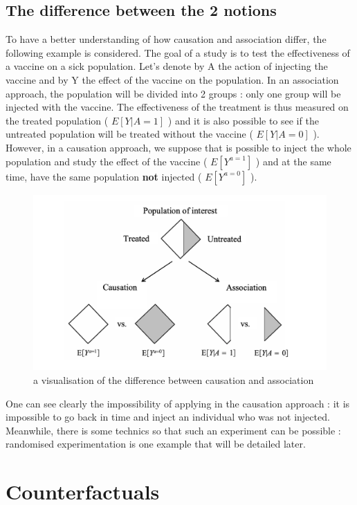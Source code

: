\documentclass{article}
\begin{document}
	\subsection{The difference between the 2 notions}

To have a better understanding of how causation and association differ, the following example is considered. The goal of a study is to test the effectiveness of a vaccine on a sick population. Let's denote by A the action of injecting the vaccine and by Y the effect of the vaccine on the population. In an association approach, the population will be divided into 2 groups : only one group will be injected with the vaccine. The effectiveness of the treatment is thus measured on the treated population ( $E[Y|A = 1]$ ) and it is also possible to see if the untreated population will be treated without the vaccine ( $E[Y|A = 0]$ ). However, in a causation approach, we suppose that is possible to inject the whole population and study the effect of the vaccine ( $E[Y^{a=1}]$ ) and at the same time, have the same population \textbf{not} injected ( $E[Y^{a=0}]$ ). 

\begin{figure}[h]
\centering
\includegraphics[width=0.6 \textwidth]{figures/asso_caus.png}
\caption{a visualisation of the difference between causation and association}
\end{figure}

One can see clearly the impossibility of applying in the causation approach : it is impossible to go back in time and inject an individual who was not injected. Meanwhile, there is some technics so that such an experiment can be possible : randomised experimentation is one example that will be detailed later.


\section{Counterfactuals}
\end{document}
